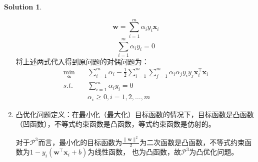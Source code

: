\documentclass[a4paper,UTF8]{article}
\theoremstyle{definition}
\newtheorem*{solution}{Solution}
\begin{document}
\begin{solution}
\begin{enumerate}[(1)]
		      \[\mathbf{w}=\sum\limits_{i=1}^m\alpha_iy_i\mathbf{x}_i\]
		      \[\sum\limits_{i=1}^m\alpha_iy_i=0\]
		      将上述两式代入得到原问题的对偶问题为：
		      \begin{align*}
			      \mathop{min}\limits_{\bm{\alpha}} & \quad \sum\limits_{i=1}^m \alpha_i - \frac{1}{2}\sum\limits_{i=1}^m \sum\limits_{j=1}^m\alpha_i \alpha_j y_i y_j\mathbf{x}_i^{\top}\mathbf{x}_i \\
			      s.t.                              & \quad \sum\limits_{i=1}^m\alpha_iy_i=0                                                                                                          \\
			                                        & \quad \alpha_i\geq 0, i=1,2,\ldots,m
		      \end{align*}
		\item
		      凸优化问题定义：在最小化（最大化）目标函数的情况下，目标函数是凸函数（凹函数），不等式约束函数是凸函数，等式约束函数是仿射的。

		      对于$\mathcal{P}^3$而言，最小化的目标函数为$\frac{\|\mathbf{w}\|^2}{2}$为二次函数是凸函数，不等式约束函数为$1-y_i(\mathbf{w}^{\top}\mathbf{x}_i+b)$为线性函数，
		      也为凸函数，故$\mathcal{P}^3$为凸优化问题。


\end{enumerate}
\end{solution}
\end{document}
